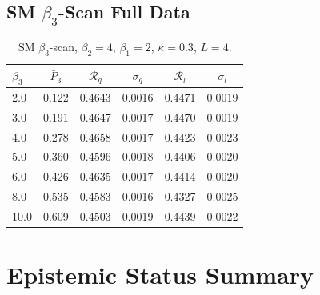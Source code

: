 \documentclass[12pt,a4paper]{article}
\newcommand{\R}{\mathcal{R}}           %
\theoremstyle{plain}
\theoremstyle{definition}
\theoremstyle{remark}
\begin{document}
\subsection{SM $\beta_3$-Scan Full Data}

\begin{table}[H]
\centering
\begin{tabular}{lccccc}
\toprule
$\beta_3$ & $\bar{P}_3$ & $\R_q$ & $\sigma_q$ & $\R_l$ & $\sigma_l$ \\
\midrule
 2.0 & 0.122 & 0.4643 & 0.0016 & 0.4471 & 0.0019 \\
 3.0 & 0.191 & 0.4647 & 0.0017 & 0.4470 & 0.0019 \\
 4.0 & 0.278 & 0.4658 & 0.0017 & 0.4423 & 0.0023 \\
 5.0 & 0.360 & 0.4596 & 0.0018 & 0.4406 & 0.0020 \\
 6.0 & 0.426 & 0.4635 & 0.0017 & 0.4414 & 0.0020 \\
 8.0 & 0.535 & 0.4583 & 0.0016 & 0.4327 & 0.0025 \\
10.0 & 0.609 & 0.4503 & 0.0019 & 0.4439 & 0.0022 \\
\bottomrule
\end{tabular}
\caption{SM $\beta_3$-scan, $\beta_2=4$, $\beta_1=2$, $\kappa=0.3$, $L=4$.}
\end{table}

\section{Epistemic Status Summary}
\label{app:epistemic}
\end{document}
